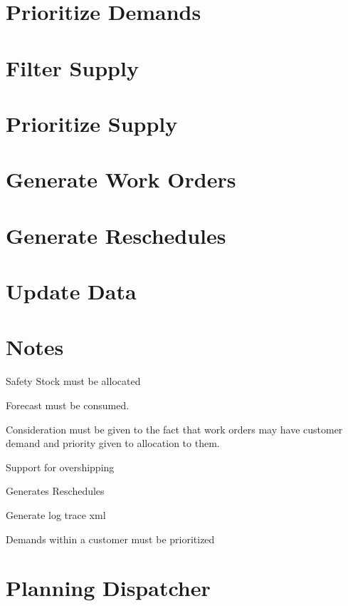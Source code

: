 \documentclass[letterpaper,10pt,english]{sphinxmanual}
\begin{document}
\section{Prioritize Demands}
\label{APS/PlanningComponentsPaper:prioritize-demands}

\section{Filter Supply}
\label{APS/PlanningComponentsPaper:filter-supply}

\section{Prioritize Supply}
\label{APS/PlanningComponentsPaper:prioritize-supply}

\section{Generate Work Orders}
\label{APS/PlanningComponentsPaper:generate-work-orders}

\section{Generate Reschedules}
\label{APS/PlanningComponentsPaper:generate-reschedules}

\section{Update Data}
\label{APS/PlanningComponentsPaper:update-data}

\section{Notes}
\label{APS/PlanningComponentsPaper:notes}
Safety Stock must be allocated

Forecast must be consumed.

Consideration must be given to the fact that work orders may have
customer demand and priority given to allocation to them.

Support for overshipping

Generates Reschedules

Generate log trace xml

Demands within a customer must be prioritized


\section{Planning Dispatcher}
\label{APS/PlanningComponentsPaper:planning-dispatcher}
\end{document}
